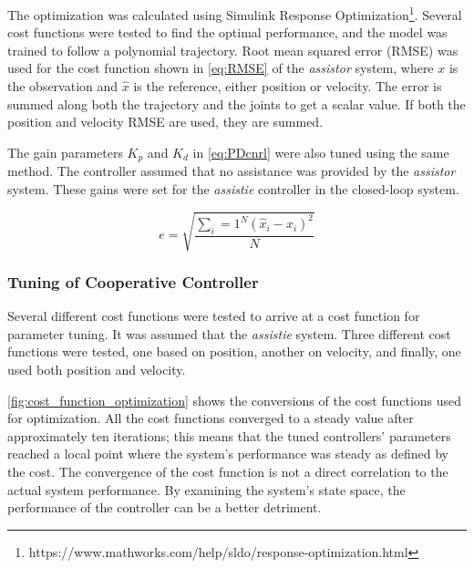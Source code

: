 The optimization was calculated using Simulink Response Optimization\footnote{https://www.mathworks.com/help/sldo/response-optimization.html}. Several cost functions were tested to find the optimal performance, and the model was trained to follow a polynomial trajectory. Root mean squared error (RMSE) was used for the cost function shown in \autoref{eq:RMSE} of the \textit{assistor} system, where $x$ is the observation and $\hat{x}$ is the reference, either position or velocity. The error is summed along both the trajectory and the joints to get a scalar value. If both the position and velocity RMSE are used, they are summed.

The gain parameters $K_p$ and $K_d$ in \autoref{eq:PDcnrl} were also tuned using the same method. The controller assumed that no assistance was provided by the \textit{assistor} system. These gains were set for the \textit{assistie} controller in the closed-loop system.

\begin{equation}
    e = \sqrt{ \frac{ \sum_i=1^N ( \hat{x}_i - x_i )^2 }{N}  }
    \label{eq:RMSE}
\end{equation}

\subsubsection{Tuning of Cooperative Controller}
Several different cost functions were tested to arrive at a cost function for parameter tuning. It was assumed that the \textit{assistie} system. Three different cost functions were tested, one based on position, another on velocity, and finally, one used both position and velocity.


\autoref{fig:cost_function_optimization} shows the conversions of the cost functions used for optimization. All the cost functions converged to a steady value after approximately ten iterations; this means that the tuned controllers' parameters reached a local point where the system's performance was steady as defined by the cost. The convergence of the cost function is not a direct correlation to the actual system performance. By examining the system's state space, the performance of the controller can be a better detriment.





